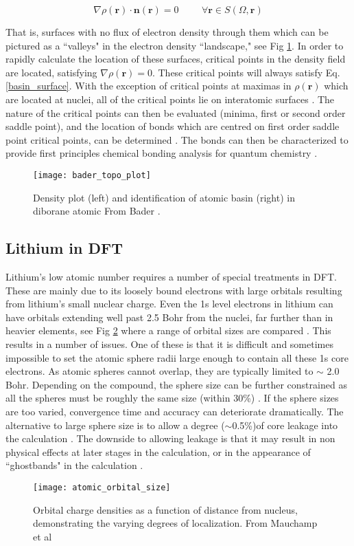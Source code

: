 \begin{equation}
\nabla \rho(\textbf{r}) \cdot \textbf{n}(\textbf{r}) = 0   \hspace{1cm} \forall\textbf{r} \in S(\Omega,\textbf{r})
\label{basin_surface}
\end{equation}

That is, surfaces with no flux of electron density through them which can be pictured as a ``valleys" in the electron density ``landscape," see Fig \ref{topo_plot}. In order to  rapidly calculate the location of these surfaces, critical points in the density field are located, satisfying $\nabla \rho(\textbf{r})=0$.  These critical points will always satisfy Eq. \ref{basin_surface}.  With the exception of critical points at maximas in $\rho(\textbf{r})$ which are located at nuclei, all of the critical points lie on interatomic surfaces \cite{critic2}. The nature of the critical points can then be evaluated (minima, first or second order saddle point), and the location of bonds which are centred on first order saddle point critical points, can be determined \cite{critic2}.  The bonds can then be characterized to provide first principles chemical bonding analysis for quantum chemistry \cite{fugel_variety_2018}.  

\begin{figure}
	\centering
	\texttt{[image: bader\_topo\_plot]}
	\caption{Density plot (left) and identification of atomic basin (right) in diborane atomic From Bader \cite{bader}.}
	\label{topo_plot}
\end{figure}


\subsection{Lithium in DFT}
Lithium's low atomic number requires a number of special treatments  in DFT.  These are mainly due to its loosely bound electrons with large orbitals resulting from lithium's small nuclear charge.  Even the 1s level electrons in lithium can have orbitals extending well past 2.5 Bohr from the nuclei, far further than in heavier elements, see Fig \ref{orbital_size} where a range of orbital sizes are compared \cite{mauchamp_ab_2006}.  This results in a number of issues. One of these is that it is difficult and sometimes impossible to set the atomic sphere radii large enough to contain all these 1s core electrons.  As atomic spheres cannot overlap, they are typically limited to $\sim$ 2.0 Bohr. Depending on the compound, the sphere size can be further constrained as all the spheres must be roughly the same size (within 30\%) \cite{wien2k}.  If the sphere sizes are too varied, convergence time and accuracy can deteriorate dramatically.  The alternative to large sphere size is to allow a degree ($\sim$0.5\%)of core leakage into the calculation \cite{wien2k}.  The downside to allowing leakage is that it may result in non physical effects at later stages in the calculation, or in the appearance of ``ghostbands" in the calculation \cite{wien2k}.

\begin{figure}
	\centering
	\texttt{[image: atomic\_orbital\_size]}
	\caption{Orbital charge densities as a function of distance from nucleus, demonstrating the varying degrees of localization.  From Mauchamp et al \cite{mauchamp_ab_2006}}
	\label{orbital_size}
\end{figure}



